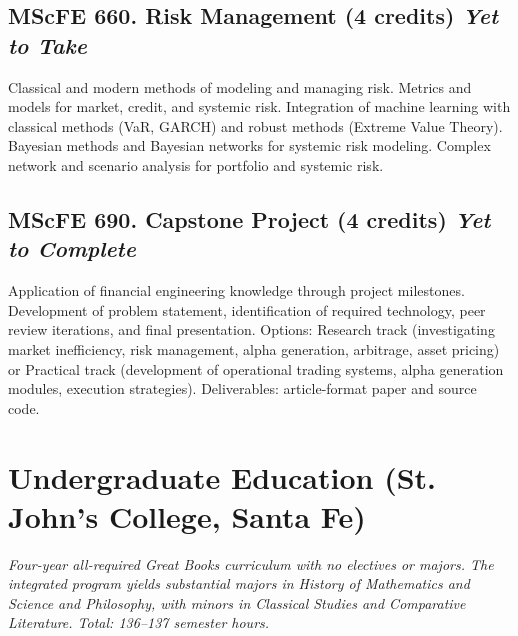\documentclass[11pt]{article}
\newcommand{\coursestatus}[1]{\hfill\normalsize\normalfont\textit{#1}}
\begin{document}
\subsection{MScFE 660. Risk Management \mdseries(4 credits) \coursestatus{Yet to Take}}
Classical and modern methods of modeling and managing risk. Metrics and models for market, credit, and systemic risk. Integration of machine learning with classical methods (VaR, GARCH) and robust methods (Extreme Value Theory). Bayesian methods and Bayesian networks for systemic risk modeling. Complex network and scenario analysis for portfolio and systemic risk.

\subsection{MScFE 690. Capstone Project \mdseries(4 credits) \coursestatus{Yet to Complete}}
Application of financial engineering knowledge through project milestones. Development of problem statement, identification of required technology, peer review iterations, and final presentation. Options: Research track (investigating market inefficiency, risk management, alpha generation, arbitrage, asset pricing) or Practical track (development of operational trading systems, alpha generation modules, execution strategies). Deliverables: article-format paper and source code.

\section{Undergraduate Education (St. John's College, Santa Fe)}

\textit{Four-year all-required Great Books curriculum with no electives or majors. The integrated program yields substantial majors in History of Mathematics and Science and Philosophy, with minors in Classical Studies and Comparative Literature. Total: 136--137 semester hours.}
\end{document}
